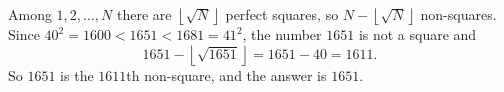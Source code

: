 Among $1,2,\dots,N$ there are $\left\lfloor\sqrt N\right\rfloor$ perfect squares, so $N-\left\lfloor\sqrt N\right\rfloor$ non-squares. Since $40^2=1600<1651<1681=41^2$, the number $1651$ is not a square and
\[1651-\left\lfloor\sqrt{1651}\right\rfloor=1651-40=1611.\]
So $1651$ is the $1611$th non-square, and the answer is $\boxed{1651}$.
